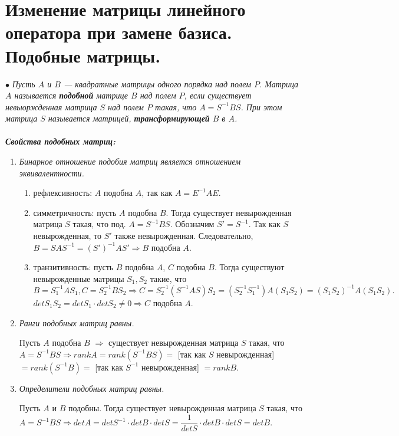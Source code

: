 \section{Изменение матрицы линейного оператора при замене базиса. Подобные матрицы.}
$\bullet$ \textit{Пусть $A$ и $B$ --- квадратные матрицы одного порядка над полем $P$. Матрица $A$ называется \textbf{подобной} матрице $B$ над полем $P$, если существует невыоржденная матрица $S$ над полем $P$ такая, что $A = S^{-1}BS$. При этом матрица $S$ называется матрицей, \textbf{трансформирующей} $B$ в $A$.}\\\\
\textit{ \textbf{Свойства подобных матриц:}}
\begin{enumerate}
	\item \textit{Бинарное отношение подобия матриц является отношением эквивалентности.}\begin{Proof}\begin{enumerate}
			\item рефлексивность: $A$ подобна $A$, так как $A = E^{-1}AE$.
			\item симметричность: пусть $A$ подобна $B$. Тогда существует невырожденная матрица $S$ такая, что под. $A = S^{-1}BS$. Обозначим $S' = S^{-1}$. Так как $S$ невырожденная, то $S'$ также невырожденная. Следовательно, $B = S A S^{-1} = (S')^{-1} A S' \Rightarrow B$ подобна $A$.
			\item транзитивность: пусть $B$ подобна $A$, $C$ подобна $B$. Тогда существуют невырожденные матрицы $S_1, S_2$ такие, что $B = S_1^{-1}AS_1, C = S_2^{-1}BS_2\Rightarrow C = S_2^{-1}(S^{-1}AS)S_2= (S_2^{-1}S_1^{-1})A(S_1S_2) = (S_1S_2)^{-1}A(S_1S_2).$ $detS_1S_2 = detS_1\cdot detS_2 \ne 0\Rightarrow C$ подобна $A$.
		\end{enumerate}
	\end{Proof}
	\item \textit{Ранги подобных матриц равны.}\begin{Proof}
		Пусть $A$ подобна $B$ $\Rightarrow$ существует невырожденная матрица $S$ такая, что $A = S^{-1} B S \Rightarrow rank A = rank  (S^{-1} B S ) =$ [так как $S$ невырожденная] $ = rank (S^{-1} B) =$ [так как $S^{-1}$ невырожденная] $= rank B$.
	\end{Proof}
	\item \textit {Определители подобных матриц равны.}\begin{Proof}
		Пусть $A$ и $B$ подобны. Тогда существует невырожденная матрица $S$ такая, что $A = S^{-1}BS\Rightarrow det A = detS^{-1}\cdot det B\cdot detS = \dfrac{1}{detS}\cdot detB\cdot detS = det B$.
\end{Proof}\end{enumerate}
